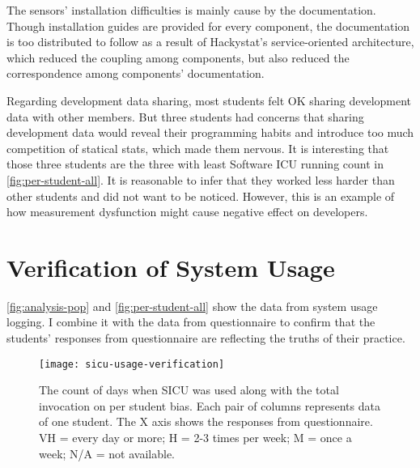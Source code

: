 The sensors' installation difficulties is mainly cause by the documentation. Though installation guides are provided for every component, the documentation is too distributed to follow as a result of Hackystat's service-oriented architecture, which reduced the coupling among components, but also reduced the correspondence among components' documentation.

Regarding development data sharing, most students felt OK sharing development data with other members. But three students had concerns that sharing development data would reveal their programming habits and introduce too much competition of statical stats, which made them nervous. It is interesting that those three students are the three with least Software ICU running count in \autoref{fig:per-student-all}. It is reasonable to infer that they worked less harder than other students and did not want to be noticed. However, this is an example of how measurement dysfunction might cause negative effect on developers.

\section {Verification of System Usage}

\autoref{fig:analysis-pop} and \autoref{fig:per-student-all} show the data from system usage logging. I combine it with the data from questionnaire to confirm that the students' responses from questionnaire are reflecting the truths of their practice. 

\begin{figure}[htbp] %
   \centering
   \texttt{[image: sicu-usage-verification]} 
   \caption[SICU usage on per student bias]{The count of days when SICU was used along with the total invocation on per student bias. Each pair of columns represents data of one student. The X axis shows the responses from questionnaire. VH = every day or more; H = 2-3 times per week; M = once a week; N/A = not available.}
   \label{fig:sicu-usage-verification}
\end{figure}

